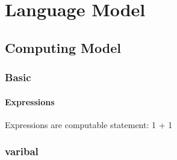 \chapter{Language Model}
\section{Computing Model}
\subsection{Basic}
\subsubsection{Expressions}
Expressions are computable statement:
1 + 1




\subsection{varibal}